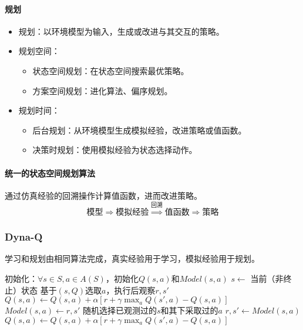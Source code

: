 \documentclass[
12pt, %
a4paper, 
oneside, %
headinclude,footinclude, %
]{scrartcl}
\begin{document}
\paragraph{规划}
\begin{itemize}
\item 规划：以环境模型为输入，生成或改进与其交互的策略。
\item 规划空间：
\begin{itemize}
\item 状态空间规划：在状态空间搜索最优策略。
\item 方案空间规划：进化算法、偏序规划。
\end{itemize}
\item 规划时间：
\begin{itemize}
\item 后台规划：从环境模型生成模拟经验，改进策略或值函数。
\item 决策时规划：使用模拟经验为状态选择动作。
\end{itemize}
\end{itemize}
\paragraph{统一的状态空间规划算法}
通过仿真经验的回溯操作计算值函数，进而改进策略。
$$ \text{模型} \Longrightarrow \text{模拟经验} \overset{\text{回溯}}{\Longrightarrow} \text{值函数} \Longrightarrow \text{策略} $$
\subsubsection[Dyna-Q]{Dyna-Q}
学习和规划由相同算法完成，真实经验用于学习，模拟经验用于规划。
\begin{myalgorithm}[Dyna-Q]
\State 初始化：$ \forall s \in S, a \in A(S) $，初始化$ Q(s, a) $和$ Model(s, a) $
\Loop
\State $ s \gets $ 当前（非终止）状态 
\State 基于$ (s, Q) $选取$ a $，执行后观察$ r,s' $ 
\State $ Q(s, a) \gets Q(s, a) + \alpha[r + \gamma \max_a Q(s', a) - Q(s, a)] $ 
\State $ Model(s, a) \gets r,s' $
 
\State 随机选择已观测过的$ s $和其下采取过的$ a $
\State $ r,s' \gets Model(s, a) $ 
\State $ Q(s, a) \gets Q(s, a) + \alpha[r + \gamma \max_a Q(s', a) - Q(s, a)] $ 
\EndFor
\EndLoop
\end{myalgorithm}
\end{document}
